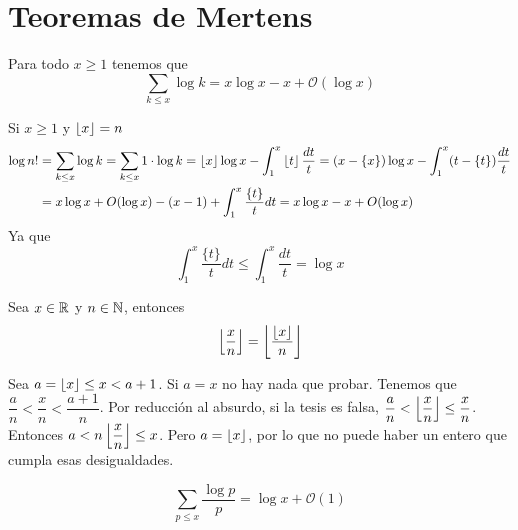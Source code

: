 \documentclass[TAN.tex]{subfiles}
\begin{document}
\section{Teoremas de Mertens}
\begin{teorema} Para todo $x\geq 1$ tenemos que
\[ \sum_{k≤x} {\log k} = x\log x -x+ \mathcal{O}(\log x) \]
\end{teorema}

\begin{dem}
Si $x\geq 1$ y $\left\lfloor{ x }\right\rfloor = n$
\begin{align*}
\log n! &= \sum_{k\leq x} \log k = \sum_{k \leq x} 1 \cdot \log k = \left\lfloor{ x }\right\rfloor\log x - \int_1^x \left\lfloor{ t }\right\rfloor \frac{dt}{t} = (x-\left\{{x}\right\})\log x - \int_1^x (t-\left\{{t}\right\})\frac{dt}{t}\\
& =
x\log x + O(\log x) - (x-1) + \int_1^x\frac{\{t\}}{t}dt =  x\log x - x  + O(\log x)
\end{align*}
Ya que 
$$
 \int_1^x\frac{\{t\}}{t}dt  \leq  \int_1^x\frac{dt}{t} = \log x 
$$

\end{dem}
\begin{lemma}
Sea $x\in\mathbb{R}$ y $n\in\mathbb{N}$, entonces
$$
\left\lfloor{\frac{x}{n}}\right\rfloor = \left\lfloor{\frac{\left\lfloor{x}\right\rfloor}{n}}\right\rfloor
$$
\end{lemma}
\begin{dem}
Sea $a=\left\lfloor{x}\right\rfloor\leq x < a+1$. Si $a=x$ no hay nada que probar. Tenemos que $\dfrac{a}{n}<\dfrac{x}{n}<\dfrac{a+1}{n}$. Por reducción al absurdo, si la tesis es falsa, $\dfrac{a}{n}<\left\lfloor{\dfrac{x}{n}}\right\rfloor\leq \dfrac{x}{n}$. Entonces $a<n\left\lfloor{\dfrac{x}{n}}\right\rfloor\leq x$. Pero $a=\left\lfloor{x}\right\rfloor$, por lo que no puede haber un entero que cumpla esas desigualdades.
\end{dem}
\begin{teorema}
\[ \sum_{p≤x} \frac{\log p}{p} = \log x + \mathcal{O}(1) \]
\end{teorema}
\end{document}
